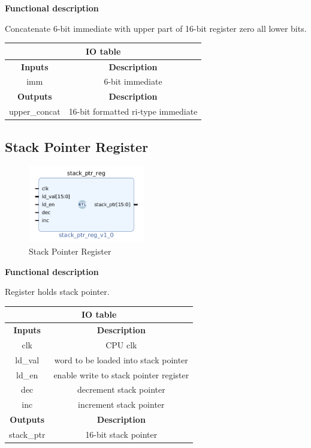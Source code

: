 \documentclass{article}
\begin{document}
\begin{par}
	\textbf{Functional description}
	\begin{par}
		Concatenate 6-bit immediate with upper part of 16-bit register zero all lower bits. 
	\end{par}
	
	\begin{center}
		\begin{tabular}{|c|c|}
			\hline 
			\multicolumn{2}{|c|}{\textbf{IO table}} \\
			\hline 
			\textbf{Inputs} & \textbf{Description} \\ 
			\hline 
			imm & 6-bit immediate \\ 
			\hline 
			\textbf{Outputs} & \textbf{Description} \\ 
			\hline 
			upper\_concat & 16-bit formatted ri-type immediate \\
			\hline
		\end{tabular}
	\end{center}

	\newpage
	
	\subsection{Stack Pointer Register}
	
	\begin{figure}[H]
		\centering
		\includegraphics[width=2in]{img/stackPtr.png}
		\caption{Stack Pointer Register}
	\end{figure}

	\textbf{Functional description}
	\begin{par}
		Register holds stack pointer. 
	\end{par}
	
	\begin{center}
		\begin{tabular}{|c|c|}
			\hline 
			\multicolumn{2}{|c|}{\textbf{IO table}} \\
			\hline 
			\textbf{Inputs} & \textbf{Description} \\ 
			\hline 
			clk & CPU clk \\ 
			\hline 
			ld\_val & word to be loaded into stack pointer \\ 
			\hline 
			ld\_en & enable write to stack pointer register \\ 
			\hline 
			dec & decrement stack pointer \\ 
			\hline 
			inc & increment stack pointer \\ 
			\hline 
			\textbf{Outputs} & \textbf{Description} \\ 
			\hline 
			stack\_ptr & 16-bit stack pointer \\
			\hline
		\end{tabular}
	\end{center}

\end{par}
\end{document}
